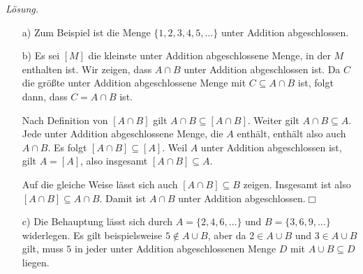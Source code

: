 \documentclass[../abbildungen.tex]{subfiles}
\begin{document}
\begin{insolution}
    \emph{Lösung.}
    \begin{enumerate}
    \item[a)] Zum Beispiel ist die Menge $\{1,2,3,4,5,\dots\}$ unter Addition abgeschlossen.

    \item[b)] Es sei $[M]$ die kleinste unter Addition abgeschlossene Menge, in der $M$ enthalten ist. Wir zeigen, dass $A\cap B$ unter Addition abgeschlossen ist.
    Da $C$ die größte unter Addition abgeschlossene Menge mit $C\subseteq A\cap B$ ist, folgt dann, dass $C=A\cap B$ ist.

    Nach Definition von $[A\cap B]$ gilt $A\cap B\subseteq [A\cap B]$. Weiter gilt $A\cap B\subseteq A$. Jede unter Addition abgeschlossene Menge, die $A$ enthält, enthält also auch $A\cap B$. Es folgt $[A\cap B]\subseteq [A]$. Weil $A$ unter Addition abgeschlossen ist, gilt $A=[A]$, also insgesamt $[A\cap B]\subseteq A$.

    Auf die gleiche Weise lässt sich auch $[A\cap B]\subseteq B$ zeigen. Insgesamt ist also $[A\cap B]\subseteq A\cap B$. Damit ist $A\cap B$ unter Addition abgeschlossen.\hfill$\Box$

    \item[c)] Die Behauptung lässt sich durch $A=\{2,4,6,\dots\}$ und $B=\{3,6,9,\dots\}$ widerlegen. Es gilt beispielsweise $5\notin A\cup B$, aber da $2\in A\cup B$ und $3\in A\cup B$ gilt, muss $5$ in jeder unter Addition abgeschlossenen Menge $D$ mit $A\cup B\subseteq D$ liegen.
    \end{enumerate}
\end{insolution}
\end{document}
